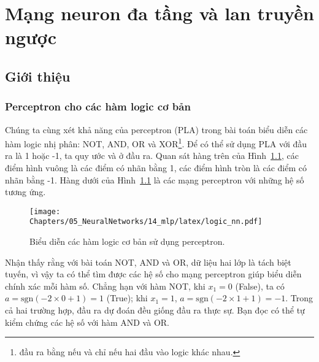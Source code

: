 \chapter{Mạng neuron đa tầng và lan truyền ngược}
\label{cha:mlp}



\section{Giới thiệu}



\subsection{Perceptron cho các hàm logic cơ bản}

Chúng ta cùng xét khả năng của perceptron (PLA) trong bài toán biểu
diễn các hàm logic nhị phân: NOT, AND, OR và XOR\footnote{đầu ra bằng 
nếu và chỉ nếu hai đầu vào logic khác nhau.}. Để có thể sử dụng PLA với
đầu ra là 1 hoặc -1, ta quy ước  và  ở đầu ra. Quan sát hàng trên của Hình~\ref{fig:14_1}, các điểm
hình vuông là các điểm có nhãn bằng 1, các điểm hình tròn là các
điểm có nhãn bằng -1. Hàng dưới của Hình~\ref{fig:14_1} là các mạng
perceptron với những hệ số tương ứng.
\begin{figure}[t]
\vspace{.1in}
\centering
\texttt{[image: Chapters/05\_NeuralNetworks/14\_mlp/latex/logic\_nn.pdf]}
\caption[]{Biểu diễn các hàm logic cơ bản sử dụng perceptron.}
\label{fig:14_1}
\end{figure}
Nhận thấy rằng với bài toán NOT, AND và OR, dữ liệu hai lớp là tách biệt tuyến, vì vậy ta có thể tìm được các hệ số cho mạng perceptron giúp biểu diễn
chính xác mỗi hàm số. Chẳng hạn với hàm NOT, khi $x_1 = 0$ (False), ta có $a =
\text{sgn}(-2 \times 0+1) = 1$ (True); khi $x_1 = 1$, $a = \text{sgn}(-2\times 1 + 1) =
-1$. Trong cả hai trường hợp, đầu ra dự đoán đều giống đầu ra thực sự. Bạn
đọc có thể tự kiểm chứng các hệ số với hàm AND và OR.

